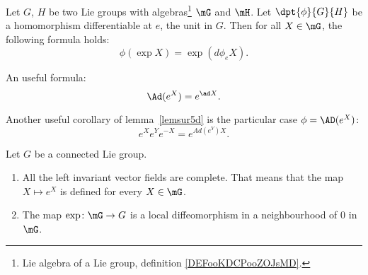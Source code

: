 \begin{lemma}		\label{lemsur5d}
    Let $G$, $H$ be two Lie groups with algebras\footnote{Lie algebra of a Lie group, definition \ref{DEFooKDCPooZOJsMD}.} $\mG$ and $\mH$. Let $\dpt{\phi}{G}{H}$ be a homomorphism differentiable at $e$, the unit in $G$. Then for all $X\in\mG$, the following formula holds:
	\[
		\phi(\exp X)=\exp(d\phi_eX).
	\]
\end{lemma}

\begin{corollary}\label{Ad_e}
An useful formula:
\[
   \Ad(e^X)=e^{\ad X}.
\]
\end{corollary}

\begin{corollary}
Another useful corollary of lemma~\ref{lemsur5d} is the particular case $\phi=\AD(e^X)$:
\[
   e^Xe^Ye^{-X}=e^{Ad(e^Y)X}.
\]
\label{cor:eXeYe-X}
\end{corollary}

\begin{proposition}
	Let $G$ be a connected Lie group.
	\begin{enumerate}

		\item
			All the left invariant vector fields are complete. That means that the map $X\mapsto  e^{X}$ is defined for every $X\in \mG$.
		\item
			The map $\exp\colon \mG\to G$ is a local diffeomorphism in a neighbourhood of $0$ in $\mG$.
	\end{enumerate}
\end{proposition}

